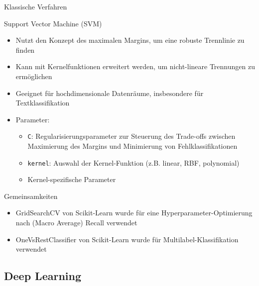 \documentclass[aspectratio=169]{beamer} %
\begin{document}
\begin{frame}{Klassische Verfahren}
    \begin{block}{Support Vector Machine (SVM)}
        \begin{itemize}
            \item Nutzt den Konzept des maximalen Margins, um eine robuste Trennlinie zu finden
            \item Kann mit Kernelfunktionen erweitert werden, um nicht-lineare Trennungen zu ermöglichen
            \item Geeignet für hochdimensionale Datenräume, insbesondere für Textklassifikation
            \item Parameter:
                  \begin{itemize}
                      \item \texttt{C}: Regularisierungsparameter zur Steuerung des Trade-offs zwischen Maximierung des Margins und Minimierung von Fehlklassifikationen
                      \item \texttt{kernel}: Auswahl der Kernel-Funktion (z.B. linear, RBF, polynomial)
                      \item Kernel-spezifische Parameter
                  \end{itemize}
        \end{itemize}
    \end{block}
\end{frame}


\begin{frame}
    \begin{block}{Gemeinsamkeiten} %
        \begin{itemize}
            \item GridSearchCV von Scikit-Learn wurde für eine Hyperparameter-Optimierung nach (Macro Average) Recall verwendet
            \item OneVsRestClassifier von Scikit-Learn wurde für Multilabel-Klassifikation verwendet
        \end{itemize}
    \end{block}
\end{frame}

\subsection{Deep Learning}
\end{document}
